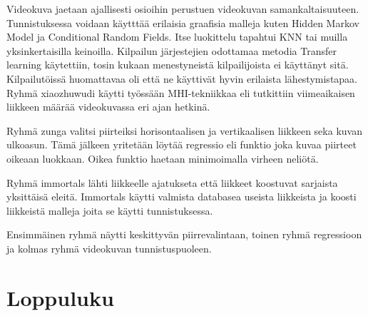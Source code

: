 Videokuva jaetaan ajallisesti osioihin perustuen videokuvan samankaltaisuuteen. Tunnistuksessa voidaan käytttää erilaisia graafisia malleja
kuten Hidden Markov Model ja Conditional Random Fields. Itse luokittelu tapahtui KNN tai muilla yksinkertaisilla keinoilla. 
Kilpailun järjestejien odottamaa metodia Transfer learning käytettiin, tosin kukaan menestyneistä kilpailijoista ei käyttänyt sitä.\\

Kilpailutöissä huomattavaa oli että ne käyttivät hyvin erilaista lähestymistapaa. 
Ryhmä xiaozhuwudi käytti työssään MHI-tekniikkaa eli tutkittiin viimeaikaisen liikkeen määrää videokuvassa eri ajan hetkinä.

Ryhmä zunga valitsi piirteiksi horisontaalisen ja vertikaalisen liikkeen seka kuvan ulkoasun. Tämä jälkeen yritetään löytää
regressio eli funktio joka kuvaa piirteet oikeaan luokkaan. Oikea funktio haetaan minimoimalla virheen neliötä.

Ryhmä immortals lähti liikkeelle ajatukseta että liikkeet koostuvat sarjaista yksittäisä eleitä.
Immortals käytti valmista databasea useista liikkeista ja koosti liikkeistä malleja joita se käytti tunnistuksessa.

Ensimmäinen ryhmä näytti keskittyvän piirrevalintaan, toinen ryhmä regressioon ja kolmas ryhmä videokuvan tunnistuspuoleen.



\section{Loppuluku}




